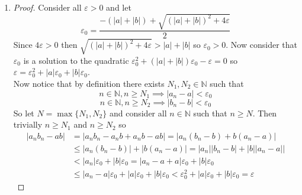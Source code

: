 \documentclass[12pt]{article}
\theoremstyle{definition}
\theoremstyle{definition}
\theoremstyle{definition}
\theoremstyle{definition}
\begin{document}
\begin{flushleft}
\begin{enumerate}
    \item
    \begin{proof}
        Consider all $\varepsilon > 0$ and let
        \[
            \varepsilon_0 = \frac{-(|a| + |b|) + \sqrt{(|a| + |b|)^2 + 4\varepsilon}}{2}
        \]
        Since $4\varepsilon > 0$ then $\sqrt{(|a| + |b|)^2 + 4\varepsilon} > |a| + |b|$ so $\varepsilon_0 > 0$. Now consider that $\varepsilon_0$ is a solution to the quadratic $\varepsilon_0^2 + (|a| + |b|)\varepsilon_0 - \varepsilon = 0$ so $\varepsilon = \varepsilon_0^2 + |a|\varepsilon_0 + |b|\varepsilon_0$. \\
        Now notice that by definition there exists $N_1, N_2 \in \mathbb{N}$ such that
        \[
            n \in \mathbb{N}, n \geq N_1 \implies |a_n - a| < \varepsilon_0
        \]
        \[
            n \in \mathbb{N}, n \geq N_2 \implies |b_n - b| < \varepsilon_0
        \]
        So let $N = \max\{N_1, N_2\}$ and consider all $n \in \mathbb{N}$ such that $n \geq N$. Then trivially $n \geq N_1$ and $n \geq N_2$ so
        \begin{align*}
            |a_nb_n - ab|
            &= |a_nb_n - a_nb + a_nb - ab|
            = |a_n(b_n - b) + b(a_n - a)| \\
            &\leq |a_n(b_n - b)| + |b(a_n - a)|
            = |a_n||b_n - b| + |b||a_n - a|| \\
            &< |a_n|\varepsilon_0 + |b|\varepsilon_0
            = |a_n - a + a|\varepsilon_0 + |b|\varepsilon_0 \\
            &\leq |a_n - a|\varepsilon_0 + |a|\varepsilon_0 + |b|\varepsilon_0
            < \varepsilon_0^2 + |a|\varepsilon_0 + |b|\varepsilon_0
            = \varepsilon
        \end{align*}
    \end{proof}
\end{enumerate}

\end{flushleft}
\end{document}
